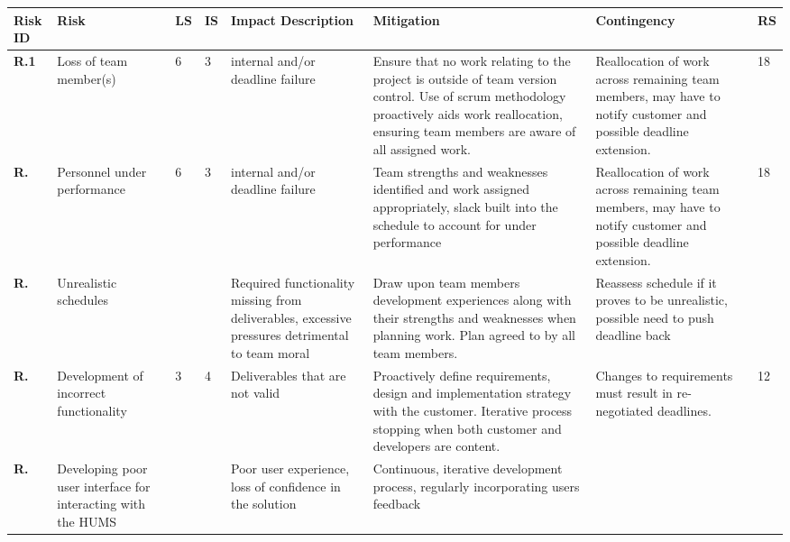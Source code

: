 \begin{longtable}[H]{| p{0.7cm} | p{2cm} | p{0.3cm} | p{0.3cm} | p{2.4cm} | p{4.1cm} | p{3cm} | p{0.4cm} |}
  \hline
  \cellcolor{titleColor}\textbf{Risk ID} &
  \cellcolor{titleColor}\textbf{Risk} &
  \cellcolor{titleColor}\textbf{LS} &
  \cellcolor{titleColor}\textbf{IS} &
  \cellcolor{titleColor}\textbf{Impact Description} &
  \cellcolor{titleColor}\textbf{Mitigation} &
  \cellcolor{titleColor}\textbf{Contingency} &
  \cellcolor{titleColor}\textbf{RS}\\
  
  \hline \textbf{R.1}
  & Loss of team member(s)
  & 6
  & 3
  & internal and/or deadline failure
  & Ensure that no work relating to the project is outside of team
  version control. Use of scrum methodology proactively aids work
  reallocation, ensuring team members are aware of all assigned work.
  & Reallocation of work across remaining team members, may have to notify customer and possible deadline extension.
  & 18 \\
  
  \hline \textbf{R.}
  & Personnel under performance
  & 6
  & 3
  & internal and/or deadline failure
  & Team strengths and weaknesses identified and work assigned appropriately, slack built into the schedule to account for under performance
  & Reallocation of work across remaining team members, may have to notify customer and possible deadline extension.
  & 18 \\
  
  \hline \textbf{R.}
  & Unrealistic schedules
  & 
  & 
  & Required functionality missing from deliverables, excessive pressures detrimental to team moral
  & Draw upon team members development experiences along with their strengths and weaknesses when planning work. Plan agreed to by all team members.
  & Reassess schedule if it proves to be unrealistic, possible need to push deadline back
  & \\
  
  \hline \textbf{R.}
  & Development of incorrect functionality
  & 3
  & 4
  & Deliverables that are not valid
  & Proactively define requirements, design and implementation
  strategy with the customer. Iterative process stopping when both
  customer and developers are content.
  & Changes to requirements must result in re-negotiated deadlines.
  & 12 \\
  
  \hline \textbf{R.}
  & Developing poor user interface for interacting with the HUMS
  & 
  & 
  & Poor user experience, loss of confidence in the solution
  & Continuous, iterative development process, regularly incorporating users feedback
  & 
  & \\
  

\end{longtable}
